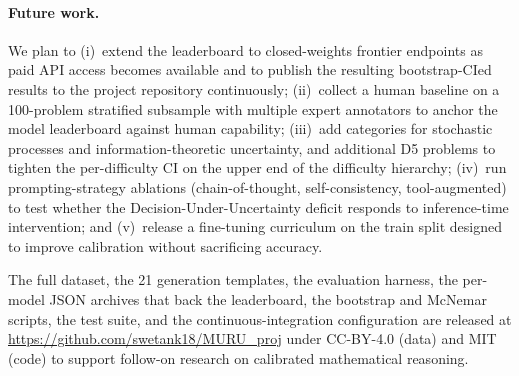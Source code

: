 \documentclass{article}
\begin{document}
\paragraph{Future work.}
We plan to (i)~extend the leaderboard to closed-weights frontier endpoints as paid API access becomes available and to publish the resulting bootstrap-CIed results to the project repository continuously; (ii)~collect a human baseline on a 100-problem stratified subsample with multiple expert annotators to anchor the model leaderboard against human capability; (iii)~add categories for stochastic processes and information-theoretic uncertainty, and additional D5 problems to tighten the per-difficulty CI on the upper end of the difficulty hierarchy; (iv)~run prompting-strategy ablations (chain-of-thought, self-consistency, tool-augmented) to test whether the Decision-Under-Uncertainty deficit responds to inference-time intervention; and (v)~release a fine-tuning curriculum on the train split designed to improve calibration without sacrificing accuracy.

The full dataset, the 21 generation templates, the evaluation harness, the per-model JSON archives that back the leaderboard, the bootstrap and McNemar scripts, the test suite, and the continuous-integration configuration are released at \url{https://github.com/swetank18/MURU_proj} under CC-BY-4.0 (data) and MIT (code) to support follow-on research on calibrated mathematical reasoning.



\end{document}
